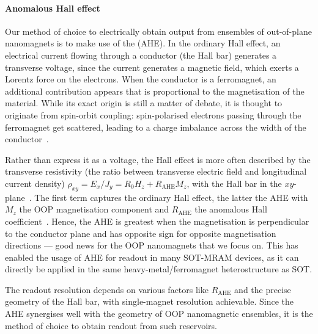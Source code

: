 \paragraph{Anomalous Hall effect}
Our method of choice to electrically obtain output from ensembles of out-of-plane nanomagnets is to make use of the  (AHE).
In the ordinary Hall effect, an electrical current flowing through a conductor (the Hall bar) generates a transverse voltage, since the current generates a magnetic field, which exerts a Lorentz force on the electrons.
When the conductor is a ferromagnet, an additional contribution appears that is proportional to the magnetisation of the material.
While its exact origin is still a matter of debate, it is thought to originate from spin-orbit coupling: spin-polarised electrons passing through the ferromagnet get scattered, leading to a charge imbalance across the width of the conductor~\cite{AHE_Culcer,AHE}. \par
Rather than express it as a voltage, the Hall effect is more often described by the transverse resistivity (the ratio between transverse electric field and longitudinal current density) $\rho_{xy} = E_x/J_y = R_0 H_z + R_\mathrm{AHE} M_z$, with the Hall bar in the $xy$-plane~\cite{SHE,AHE}.
The first term captures the ordinary Hall effect, the latter the AHE with $M_z$ the OOP magnetisation component and $R_\mathrm{AHE}$ the anomalous Hall coefficient~\cite{AHE}.
Hence, the AHE is greatest when the magnetisation is perpendicular to the conductor plane and has opposite sign for opposite magnetisation directions --- good news for the OOP nanomagnets that we focus on.
This has enabled the usage of AHE for readout in many SOT-MRAM devices, as it can directly be applied in the same heavy-metal/ferromagnet heterostructure as SOT. \par
The readout resolution depends on various factors like $R_\mathrm{AHE}$ and the precise geometry of the Hall bar, with single-magnet resolution achievable. %
Since the AHE synergises well with the geometry of OOP nanomagnetic ensembles, it is the method of choice to obtain readout from such reservoirs.

